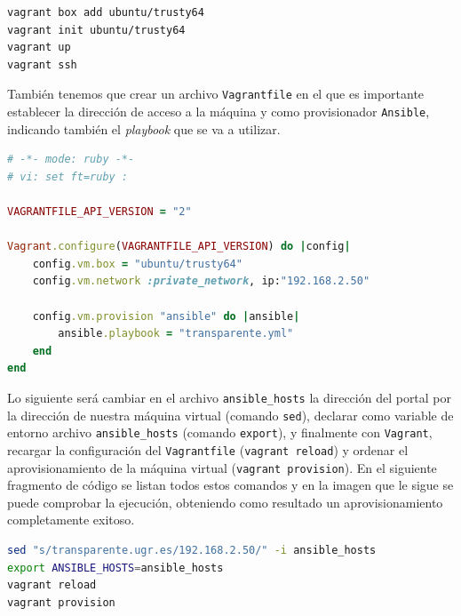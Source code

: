 \begin{lstlisting}[language=bash,captionpos=b,caption={Órdenes para crear máquina virtual Vagrant},label={lst:crear_vagrant}]
vagrant box add ubuntu/trusty64
vagrant init ubuntu/trusty64
vagrant up
vagrant ssh
\end{lstlisting}

\newpage
También tenemos que crear un archivo {\tt Vagrantfile} en el que es importante establecer la dirección de acceso a la máquina y como provisionador {\tt Ansible}, indicando también el \textit{playbook} que se va a utilizar.

\begin{lstlisting}[language=Ruby,captionpos=b,caption={Archivo Vagrantfile},label={lst:edit_vgfile}]
# -*- mode: ruby -*-
# vi: set ft=ruby :

VAGRANTFILE_API_VERSION = "2"

Vagrant.configure(VAGRANTFILE_API_VERSION) do |config|
	config.vm.box = "ubuntu/trusty64"
	config.vm.network :private_network, ip:"192.168.2.50"

	config.vm.provision "ansible" do |ansible|
		ansible.playbook = "transparente.yml"
	end
end
\end{lstlisting}

Lo siguiente será cambiar en el archivo {\tt ansible\_hosts} la dirección del portal por la dirección de nuestra máquina virtual (comando {\tt sed}), declarar como variable de entorno archivo {\tt ansible\_hosts} (comando {\tt export}), y finalmente con {\tt Vagrant}, recargar la configuración del {\tt Vagrantfile} ({\tt vagrant reload}) y ordenar el aprovisionamiento de la máquina virtual ({\tt vagrant provision}). En el siguiente fragmento de código se listan todos estos comandos y en la imagen que le sigue se puede comprobar la ejecución, obteniendo como resultado un aprovisionamiento completamente exitoso.

\begin{lstlisting}[language=bash,captionpos=b,caption={Órdenes para aprovisionar máquina Vagrant},label={lst:aprov_vagrant}]
sed "s/transparente.ugr.es/192.168.2.50/" -i ansible_hosts
export ANSIBLE_HOSTS=ansible_hosts
vagrant reload
vagrant provision
\end{lstlisting}

